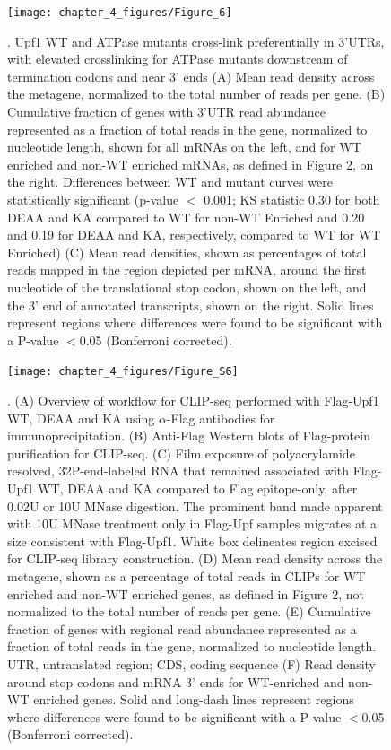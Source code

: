 \begin{figure}[ht]
  \centering
  \texttt{[image: chapter\_4\_figures/Figure\_6]}
  \caption[Figure 2]{. Upf1 WT and ATPase mutants cross-link preferentially in 3’UTRs, with elevated crosslinking for ATPase mutants downstream of termination codons and near 3’ ends (A) Mean read density across the metagene, normalized to the total number of reads per gene. (B) Cumulative fraction of genes with 3’UTR read abundance represented as a fraction of total reads in the gene, normalized to nucleotide length, shown for all mRNAs on the left, and for WT enriched and non-WT enriched mRNAs, as defined in Figure 2, on the right. Differences between WT and mutant curves were statistically significant (p-value $<$ 0.001; KS statistic 0.30 for both DEAA and KA compared to WT for non-WT Enriched and 0.20 and 0.19 for DEAA and KA, respectively, compared to WT for WT Enriched) (C) Mean read densities, shown as percentages of total reads mapped in the region depicted per mRNA, around the first nucleotide of the translational stop codon, shown on the left, and the 3’ end of annotated transcripts, shown on the right. Solid lines represent regions where differences were found to be significant with a P-value $<$0.05 (Bonferroni corrected).
    }
  \label{fig:Figure_2}
\end{figure}

\begin{figure}[ht]
  \centering
  \texttt{[image: chapter\_4\_figures/Figure\_S6]}
  \caption[Supplementary Figure 2]{. (A) Overview of workflow for CLIP-seq performed with Flag-Upf1 WT, DEAA and KA using $\alpha$-Flag antibodies for immunoprecipitation. (B) Anti-Flag Western blots of Flag-protein purification for CLIP-seq. (C) Film exposure of polyacrylamide resolved, 32P-end-labeled RNA that remained associated with Flag-Upf1 WT, DEAA and KA compared to Flag epitope-only, after 0.02U or 10U MNase digestion. The prominent band made apparent with 10U MNase treatment only in Flag-Upf samples migrates at a size consistent with Flag-Upf1. White box delineates region excised for CLIP-seq library construction. (D) Mean read density across the metagene, shown as a percentage of total reads in CLIPs for WT enriched and non-WT enriched genes, as defined in Figure 2, not normalized to the total number of reads per gene. (E) Cumulative fraction of genes with regional read abundance represented as a fraction of total reads in the gene, normalized to nucleotide length. UTR, untranslated region; CDS, coding sequence (F) Read density around stop codons and mRNA 3’ ends for WT-enriched and non-WT enriched genes. Solid and long-dash lines represent regions where differences were found to be significant with a P-value $<$0.05 (Bonferroni corrected). }
  \label{fig:Figure_S2}
\end{figure}



